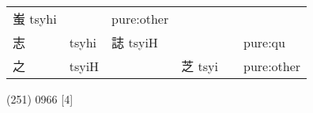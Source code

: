 \documentclass[14pt,a4paper]{scrartcl}
\begin{document}
\begin{longtable}[c]{@{}llllll@{}}
\begin{minipage}[t]{0.14\columnwidth}
蚩 tsyhi
\strut\end{minipage} &
\begin{minipage}[t]{0.14\columnwidth}\raggedright\strut
\strut\end{minipage} &
\begin{minipage}[t]{0.14\columnwidth}\raggedright\strut
pure:other
\strut\end{minipage}\tabularnewline
\begin{minipage}[t]{0.14\columnwidth}\raggedright\strut
志
\strut\end{minipage} &
\begin{minipage}[t]{0.14\columnwidth}\raggedright\strut
tsyhi
\strut\end{minipage} &
\begin{minipage}[t]{0.14\columnwidth}\raggedright\strut
誌 tsyiH
\strut\end{minipage} &
\begin{minipage}[t]{0.14\columnwidth}\raggedright\strut
\strut\end{minipage} &
\begin{minipage}[t]{0.14\columnwidth}\raggedright\strut
\strut\end{minipage} &
\begin{minipage}[t]{0.14\columnwidth}\raggedright\strut
pure:qu
\strut\end{minipage}\tabularnewline
\begin{minipage}[t]{0.14\columnwidth}\raggedright\strut
之
\strut\end{minipage} &
\begin{minipage}[t]{0.14\columnwidth}\raggedright\strut
tsyiH
\strut\end{minipage} &
\begin{minipage}[t]{0.14\columnwidth}\raggedright\strut
\strut\end{minipage} &
\begin{minipage}[t]{0.14\columnwidth}\raggedright\strut
芝 tsyi
\strut\end{minipage} &
\begin{minipage}[t]{0.14\columnwidth}\raggedright\strut
\strut\end{minipage} &
\begin{minipage}[t]{0.14\columnwidth}\raggedright\strut
pure:other
\strut\end{minipage}\tabularnewline
\bottomrule
\end{longtable}

(251) 0966 {[}4{]}
\end{document}
